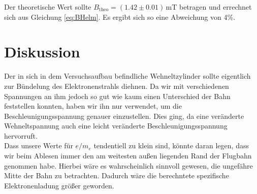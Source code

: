 \documentclass[12pt,a4paper,titlepage,headinclude,bibtotoc]{scrartcl}
\numberwithin{equation}{section}
\begin{document}
Der theoretische Wert sollte $B_\text{theo}=(1.42 \pm 0.01)\,$mT betragen und errechnet sich aus Gleichung \eqref{eq:BHelm}.
Es ergibt sich so eine Abweichung von 4\%.


\section{Diskussion}
\label{sec:diskussion}
Der in sich in dem Versuchsaufbau befindliche Wehneltzylinder sollte eigentlich zur Bündelung des Elektronenstrahls diehnen.
Da wir mit verschiedenen Spannungen an ihm jedoch so gut wie kaum einen Unterschied der Bahn feststellen konnten, haben wir ihn nur verwendet, um die Beschleunigungsspannung genauer einzustellen.
Dies ging, da eine veränderte Wehneltspannung auch eine leicht veränderte Beschleunigungsspannung hervorruft.\\
Dass unsere Werte für $e/m_e$ tendentiell zu klein sind, könnte daran legen, dass wir beim Ablesen immer den am weitesten außen liegenden Rand der Flugbahn genommen habe.
Hierbei wäre es wahrscheinlich sinnvoll gewesen, die ungefähre Mitte der Bahn zu betrachten.
Dadurch wäre die berechntete spezifische Elektronenladung größer geworden.




\end{document}
